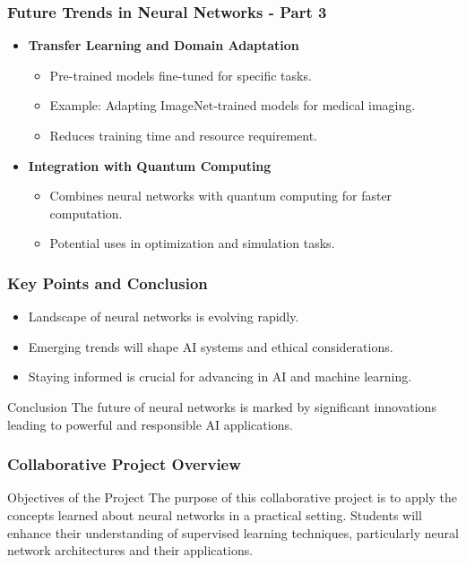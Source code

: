 \documentclass[aspectratio=169]{beamer}
\begin{document}
\begin{frame}[fragile]
    \frametitle{Future Trends in Neural Networks - Part 3}
    \begin{itemize}
        \item \textbf{Transfer Learning and Domain Adaptation}
        \begin{itemize}
            \item Pre-trained models fine-tuned for specific tasks.
            \item Example: Adapting ImageNet-trained models for medical imaging.
            \item Reduces training time and resource requirement.
        \end{itemize}

        \item \textbf{Integration with Quantum Computing}
        \begin{itemize}
            \item Combines neural networks with quantum computing for faster computation.
            \item Potential uses in optimization and simulation tasks.
        \end{itemize}
    \end{itemize}
\end{frame}

\begin{frame}[fragile]
    \frametitle{Key Points and Conclusion}
    \begin{itemize}
        \item Landscape of neural networks is evolving rapidly.
        \item Emerging trends will shape AI systems and ethical considerations.
        \item Staying informed is crucial for advancing in AI and machine learning.
    \end{itemize}
    \begin{block}{Conclusion}
        The future of neural networks is marked by significant innovations leading to powerful and responsible AI applications.
    \end{block}
\end{frame}

\begin{frame}
    \frametitle{Collaborative Project Overview}
    \begin{block}{Objectives of the Project}
        The purpose of this collaborative project is to apply the concepts learned about neural networks in a practical setting. 
        Students will enhance their understanding of supervised learning techniques, particularly neural network architectures and their applications.
    \end{block}
\end{frame}
\end{document}
